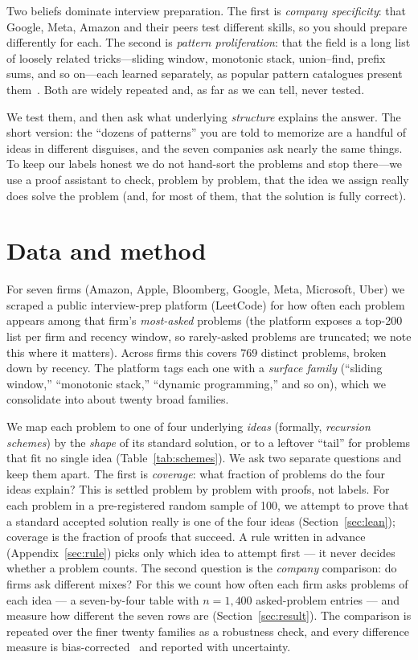 \documentclass[11pt]{article}
\begin{document}
Two beliefs dominate interview preparation. The first is \emph{company specificity}: that Google, Meta,
Amazon and their peers test different skills, so you should prepare differently for each. The second is
\emph{pattern proliferation}: that the field is a long list of loosely related tricks---sliding window,
monotonic stack, union--find, prefix sums, and so on---each learned separately, as popular pattern
catalogues present them~\cite{prashad}. Both are widely repeated and, as far as we can tell, never tested.

We test them, and then ask what underlying \emph{structure} explains the answer. The short version: the
``dozens of patterns'' you are told to memorize are a handful of ideas in different disguises, and the seven
companies ask nearly the same things. To keep our labels honest we do not hand-sort the problems and stop
there---we use a proof assistant to check, problem by problem, that the idea we assign really does solve the
problem (and, for most of them, that the solution is fully correct).

\section{Data and method}
\label{sec:data}

For seven firms (Amazon, Apple, Bloomberg, Google, Meta, Microsoft, Uber) we scraped a public
interview-prep platform (LeetCode) for how often each problem appears among that firm's
\emph{most-asked} problems
(the platform exposes a top-200 list per firm and recency window, so rarely-asked problems are truncated;
we note this where it matters). Across firms this covers 769 distinct problems, broken down by recency. The
platform tags each one with a \emph{surface family} (``sliding window,'' ``monotonic stack,'' ``dynamic
programming,'' and so on), which we consolidate into about twenty broad families.

We map each problem to one of four underlying \emph{ideas} (formally, \emph{recursion schemes}) by the
\emph{shape} of its standard solution, or to a leftover ``tail'' for problems that fit no single idea
(Table~\ref{tab:schemes}). We ask two separate questions and keep them apart. The first is \emph{coverage}: what
fraction of problems do the four ideas explain? This is settled problem by problem with proofs,
not labels. For each problem in a pre-registered random sample of 100, we attempt to prove that a
standard accepted solution really is one of the four ideas (Section~\ref{sec:lean}); coverage is
the fraction of proofs that succeed. A rule written in advance (Appendix~\ref{sec:rule}) picks
only which idea to attempt first --- it never decides whether a problem counts. The second
question is the \emph{company} comparison: do firms ask different mixes? For this we count how
often each firm asks problems of each idea --- a seven-by-four table with $n=1{,}400$
asked-problem entries --- and measure how different the seven rows are
(Section~\ref{sec:result}). The comparison is repeated over the finer twenty families as a
robustness check, and every difference measure is bias-corrected~\cite{bergsma13} and reported
with uncertainty.
\end{document}
